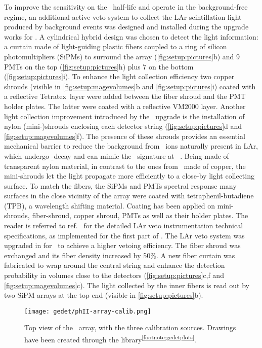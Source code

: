 To improve the sensitivity on the \onbb\ half-life and operate in the background-free
regime, an additional active veto system to collect the LAr scintillation light produced
by background events was designed and installed during the upgrade works for \phasetwo. A
cylindrical hybrid design was chosen to detect the light information: a curtain made of
light-guiding plastic fibers coupled to a ring of silicon photomultipliers (SiPMs) to
surround the array (\cref{fig:setup:pictures}b) and 9 PMTs on the top
(\cref{fig:setup:pictures}h) plus 7 on the bottom (\cref{fig:setup:pictures}i). To enhance
the light collection efficiency two copper shrouds (visible in
\cref{fig:setup:magevolumes}b and \cref{fig:setup:pictures}i) coated with a reflective
Tetratex\reg\ layer were added between the fiber shroud and the PMT holder plates. The
latter were coated with a reflective VM2000 layer. Another light collection improvement
introduced by the \phasetwo\ upgrade is the installation of nylon (mini-)shrouds enclosing
each detector string (\cref{fig:setup:pictures}d and \cref{fig:setup:magevolumes}f). The
presence of these shrouds provides an essential mechanical barrier to reduce the
background from \kvz\ ions naturally present in LAr, which undergo \b-decay and can mimic
the \onbb\ signature at \qbb~\cite{Lubashevskiy2017}.  Being made of transparent nylon
material, in contrast to the ones from \phaseone\ made of copper, the mini-shrouds let the
light propagate more efficiently to a close-by light collecting surface. To match the
fibers, the SiPMs and PMTs spectral response many surfaces in the close vicinity of the
array were coated with tetraphenil-butadiene (TPB), a wavelength shifting material.
Coating has been applied on mini-shrouds, fiber-shroud, copper shroud, PMTs as well as
their holder plates. The reader is referred to ref.~\cite{Agostini2018a} for the detailed
LAr veto instrumentation technical specifications, as implemented for the first part of
\phasetwo.
\newpar
The LAr veto system was upgraded in  for \phasetwop\ to achieve a higher vetoing
efficiency. The fiber shroud was exchanged and its fiber density increased by 50\%. A new
fiber curtain was fabricated to wrap around the central string and enhance the detection
probability in volumes close to the detectors (\cref{fig:setup:pictures}c,f and
\cref{fig:setup:magevolumes}c). The light collected by the inner fibers is read out by two
SiPM arrays at the top end (visible in \cref{fig:setup:pictures}b).

\begin{figure}
  \centering
  \texttt{[image: gedet/phII-array-calib.png]}
  \caption{%
    Top view of the \phasetwo\ array, with the three calibration sources. Drawings have
    been created through the 
    library\textsuperscript{\ref{footnote:gedetplots}}.
  }\label{fig:setup:calib-pos}
\end{figure}

